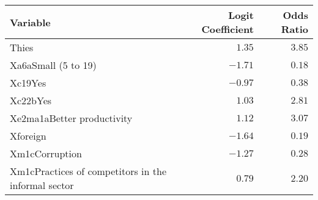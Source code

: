 \begin{longtable}{lrr}
\toprule
Variable & Logit Coefficient & Odds Ratio \\ 
\midrule
Thies & $1.35$ & $3.85$ \\ 
Xa6aSmall (5 to 19) & $-1.71$ & $0.18$ \\ 
Xc19Yes & $-0.97$ & $0.38$ \\ 
Xc22bYes & $1.03$ & $2.81$ \\ 
Xe2ma1aBetter productivity & $1.12$ & $3.07$ \\ 
Xforeign & $-1.64$ & $0.19$ \\ 
Xm1cCorruption & $-1.27$ & $0.28$ \\ 
Xm1cPractices of competitors in the informal sector & $0.79$ & $2.20$ \\ 
\bottomrule
\end{longtable}

